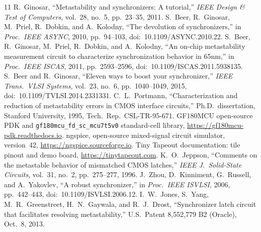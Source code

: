 \documentclass[10pt]{article}
\begin{document}
\begingroup\scriptsize
\renewcommand{\section}[2]{\vspace{2pt}{\normalsize\bfseries References}\par\vspace{0pt}}
\setlength{\itemsep}{0pt}
\begin{thebibliography}{11}\setlength{\itemsep}{0.5pt}\setlength{\parskip}{0pt}
 R.~Ginosar, ``Metastability and synchronizers: A tutorial,'' \emph{IEEE Design \& Test of
Computers}, vol.~28, no.~5, pp.~23--35, 2011.
 S.~Beer, R.~Ginosar, M.~Priel, R.~Dobkin, and A.~Kolodny, ``The devolution of synchronizers,'' in
\emph{Proc.\ IEEE ASYNC}, 2010, pp.~94--103,
doi:~10.1109/ASYNC.2010.22.
 S.~Beer, R.~Ginosar, M.~Priel, R.~Dobkin, and A.~Kolodny, ``An on-chip metastability measurement
circuit to characterize synchronization behavior in 65nm,'' in \emph{Proc.\ IEEE ISCAS}, 2011, pp.~2593--2596, doi:~10.1109/ISCAS.2011.5938135.
 S.~Beer and R.~Ginosar, ``Eleven ways to boost your synchronizer,'' \emph{IEEE Trans.\ VLSI Systems}, vol.~23, no.~6, pp.~1040--1049, 2015, doi:~10.1109/TVLSI.2014.2331331.
 C.~L.~Portmann, ``Characterization and reduction of metastability errors in CMOS interface
circuits,'' Ph.D.\ dissertation, Stanford University, 1995, Tech.\ Rep.\ CSL-TR-95-671.
 GF180MCU open-source PDK and \texttt{gf180mcu\_fd\_sc\_mcu7t5v0} standard-cell library, \url{https://gf180mcu-pdk.readthedocs.io}.
 ngspice, open-source mixed-signal circuit simulator, version~42, \url{https://ngspice.sourceforge.io}.
 Tiny Tapeout documentation: tile pinout and demo board, \url{https://tinytapeout.com}.
 K.~O.~Jeppson, ``Comments on the metastable behavior of mismatched CMOS latches,'' \emph{IEEE J.\ Solid-State Circuits}, vol.~31, no.~2, pp.~275--277, 1996.
 J.~Zhou, D.~Kinniment, G.~Russell, and A.~Yakovlev, ``A robust synchronizer,'' in \emph{Proc.\ IEEE ISVLSI}, 2006, pp.~442--443, doi:~10.1109/ISVLSI.2006.12.
 I.~W.~Jones, S.~Yang, M.~R.~Greenstreet, H.~N.~Gaywala, and R.~J.~Drost, ``Synchronizer latch circuit that facilitates resolving metastability,'' U.S.\ Patent 8{,}552{,}779 B2 (Oracle), Oct.~8, 2013.
\end{thebibliography}
\endgroup
\end{document}
